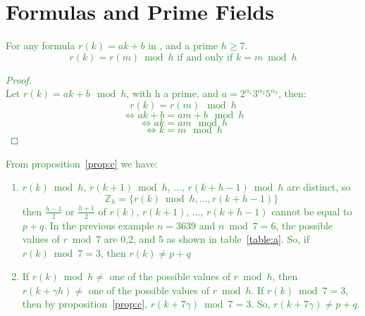\documentclass{article}
\begin{document}
\section{Formulas and Prime Fields}\label{sec:2}
\textcolor{ForestGreen}{
\begin{proposition}\label{prop:c}
For any formula $r(k) = a k + b$ in \cite{Mohammed2017}, and a prime $h \geq 7$.
\begin{equation*}
r(k) = r(m) \bmod h \text{ if and only if } k = m \bmod h
\end{equation*}
\end{proposition}
\begin{proof}
~\\
Let $r(k) = ak +b \mod h$, with h a prime, and $a = 2^{\alpha_1} 3^{\alpha_2} 5^{\alpha_3}$, then:\\
$$r(k) = r(m) \mod h$$
$$\iff ak+b = am+b \mod h$$
$$\iff ak = am \mod h$$
$$\iff k=m \mod h$$
\end{proof}
From proposition~\ref{prop:c} we have:
\begin{enumerate}
\item $r(k) \bmod h$, $r(k+1) \bmod h$, ..., $r(k+h-1) \bmod h$ are distinct, so 
\begin{equation*}
\mathbb{Z}_h = \{r(k) \bmod h, ..., r(k+h-1)\}
\end{equation*}
then $\frac{h-1}{2}$ or $\frac{h+1}{2}$ of $r(k)$, $r(k+1)$, ..., $r(k+h-1)$ cannot be equal to $p+q$. In the previous example $n= 3639$ and $n \bmod 7 = 6$, the possible values of $r \bmod 7$ are 0,2, and 5 as shown in table~\ref{table:a}. So, if $r(k) \bmod 7 = 3$, then $r(k) \neq p+q$
\item If $r(k) \bmod h \neq$ one of the possible values of $r \bmod h$, then 
$r(k+\gamma h) \neq$ one of the possible values of $r \bmod h$. If $r(k) \bmod 7 =3 $, then by proposition~\ref{prop:c}, $r(k+7\gamma) \bmod 7 = 3$. So, $r(k+7\gamma) \neq p+q$.
\end{enumerate}
}
\end{document}
